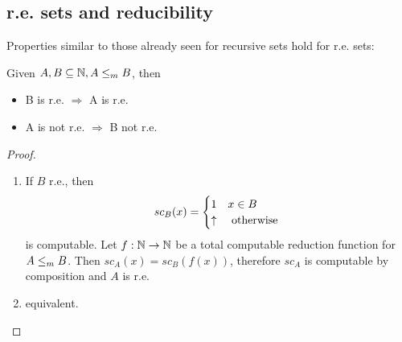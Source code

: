 \subsection{r.e. sets and reducibility}
Properties similar to those already seen for recursive sets hold for r.e. sets:
\begin{observation}
  Given $ A,B \subseteq \mathbb{N}, A\leq_m B $, then
  \begin{itemize}
  \item B is r.e. $ \Rightarrow $ A is r.e.
  \item A is not r.e. $ \Rightarrow $ B not r.e.
  \end{itemize}
  \begin{proof}
    \begin{enumerate}
      \item If $B$ r.e., then
      \begin{equation*}
        sc_B(x) = \begin{cases}
          1 & x \in B \\
          \uparrow & $ otherwise $
        \end{cases}
      \end{equation*}
      is computable.  Let $ f:\mathbb{N}\rightarrow\mathbb{N} $ be a total
      computable reduction function for $ A\leq_m B $. Then
      $ sc_A(x) = sc_B(f(x)) $, therefore $ sc_A $ is computable by
      composition and $A$ is r.e.
      \item equivalent.
    \end{enumerate}
  \end{proof}
\end{observation}
